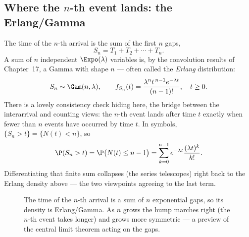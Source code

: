 \subsection{Where the $n$-th event lands: the Erlang/Gamma}

The time of the $n$-th arrival is the sum of the first $n$ gaps,
\[
S_n = T_1 + T_2 + \cdots + T_n.
\]
A sum of $n$ independent $\Expo(\lambda)$ variables is, by the convolution
results of Chapter~17, a Gamma with shape $n$ --- often called the \emph{Erlang}
distribution:
\[
S_n \sim \Gam(n, \lambda), \qquad
f_{S_n}(t) = \frac{\lambda^n t^{\,n-1} e^{-\lambda t}}{(n-1)!}, \quad t \ge 0.
\]
There is a lovely consistency check hiding here, the bridge between the
interarrival and counting views: the $n$-th event lands after time $t$ exactly
when fewer than $n$ events have occurred by time $t$. In symbols,
$\{S_n > t\} = \{N(t) < n\}$, so
\[
\P(S_n > t) = \P\big(N(t) \le n-1\big)
= \sum_{k=0}^{n-1} e^{-\lambda t}\frac{(\lambda t)^k}{k!}.
\]
Differentiating that finite sum collapses (the series telescopes) right back to
the Erlang density above --- the two viewpoints agreeing to the last term.

\begin{figure}[H]
\centering
{}
\caption{The time of the $n$-th arrival is a sum of $n$ exponential gaps, so its
density is Erlang/Gamma. As $n$ grows the hump marches right (the $n$-th event
takes longer) and grows more symmetric --- a preview of the central limit theorem
acting on the gaps.}
\label{ch25:fig-erlang}
\end{figure}

